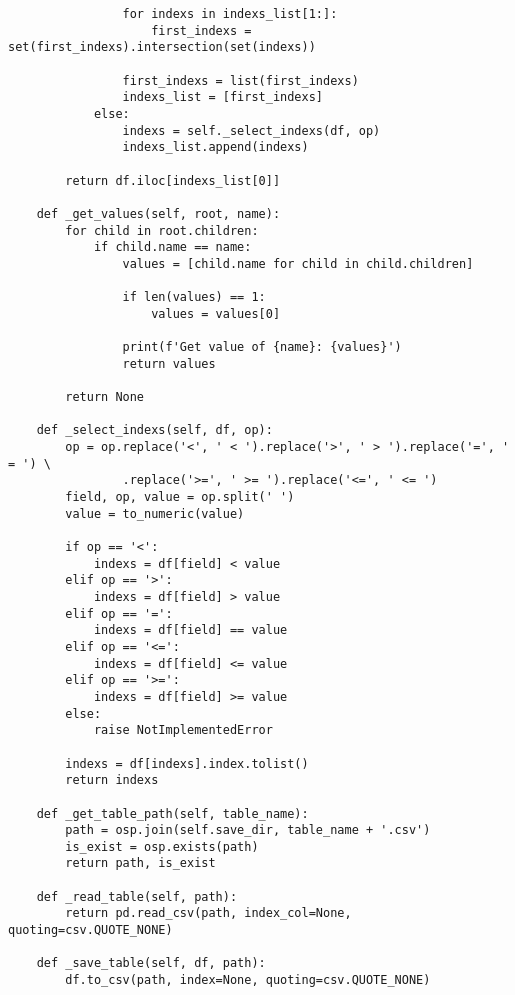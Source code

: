 \begin{appendix}
\begin{lstlisting}
                for indexs in indexs_list[1:]:
                    first_indexs = set(first_indexs).intersection(set(indexs))

                first_indexs = list(first_indexs)
                indexs_list = [first_indexs]
            else:
                indexs = self._select_indexs(df, op)
                indexs_list.append(indexs)
            
        return df.iloc[indexs_list[0]]
    
    def _get_values(self, root, name):
        for child in root.children:
            if child.name == name:
                values = [child.name for child in child.children]

                if len(values) == 1:
                    values = values[0]

                print(f'Get value of {name}: {values}')
                return values

        return None
    
    def _select_indexs(self, df, op):
        op = op.replace('<', ' < ').replace('>', ' > ').replace('=', ' = ') \
                .replace('>=', ' >= ').replace('<=', ' <= ')
        field, op, value = op.split(' ')
        value = to_numeric(value)

        if op == '<':
            indexs = df[field] < value
        elif op == '>':
            indexs = df[field] > value
        elif op == '=':
            indexs = df[field] == value
        elif op == '<=':
            indexs = df[field] <= value
        elif op == '>=':
            indexs = df[field] >= value
        else:
            raise NotImplementedError

        indexs = df[indexs].index.tolist()
        return indexs

    def _get_table_path(self, table_name):
        path = osp.join(self.save_dir, table_name + '.csv')
        is_exist = osp.exists(path)
        return path, is_exist
    
    def _read_table(self, path):
        return pd.read_csv(path, index_col=None, quoting=csv.QUOTE_NONE)
    
    def _save_table(self, df, path):
        df.to_csv(path, index=None, quoting=csv.QUOTE_NONE)
\end{lstlisting}

\end{appendix}